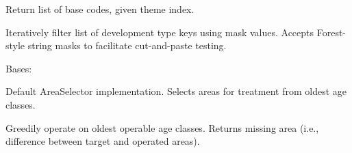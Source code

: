 \documentclass[letterpaper,10pt,english]{sphinxmanual}
\begin{document}
\begin{fulllineitems}

\begin{fulllineitems}
\label{\detokenize{forest:forest.ForestModel.theme_basecodes}}
Return list of base codes, given theme index.

\end{fulllineitems}


\begin{fulllineitems}
\label{\detokenize{forest:forest.ForestModel.tree}}
\end{fulllineitems}


\begin{fulllineitems}
\label{\detokenize{forest:forest.ForestModel.unmask}}
Iteratively filter list of development type keys using mask values.
Accepts Forest-style string masks to facilitate cut-and-paste testing.

\end{fulllineitems}


\end{fulllineitems}


\begin{fulllineitems}
\label{\detokenize{forest:forest.GreedyAreaSelector}}
Bases: 

Default AreaSelector implementation. Selects areas for treatment from oldest age classes.

\begin{fulllineitems}
\label{\detokenize{forest:forest.GreedyAreaSelector.operate}}
Greedily operate on oldest operable age classes.
Returns missing area (i.e., difference between target and operated areas).

\end{fulllineitems}


\end{fulllineitems}
\end{document}

